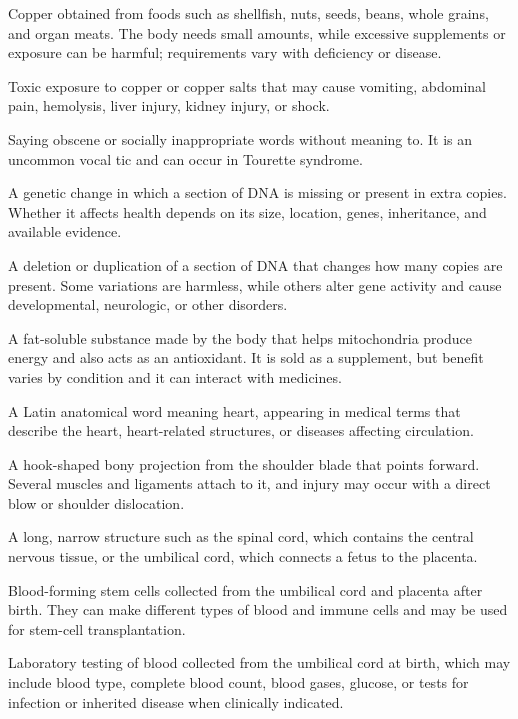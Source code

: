  Copper obtained from foods such as shellfish, nuts, seeds, beans, whole grains, and organ meats. The body needs small amounts, while excessive supplements or exposure can be harmful; requirements vary with deficiency or disease.

 Toxic exposure to copper or copper salts that may cause vomiting, abdominal pain, hemolysis, liver injury, kidney injury, or shock.

 Saying obscene or socially inappropriate words without meaning to. It is an uncommon vocal tic and can occur in Tourette syndrome.

 A genetic change in which a section of DNA is missing or present in extra copies. Whether it affects health depends on its size, location, genes, inheritance, and available evidence.

 A deletion or duplication of a section of DNA that changes how many copies are present. Some variations are harmless, while others alter gene activity and cause developmental, neurologic, or other disorders.

 A fat-soluble substance made by the body that helps mitochondria produce energy and also acts as an antioxidant. It is sold as a supplement, but benefit varies by condition and it can interact with medicines.

 A Latin anatomical word meaning heart, appearing in medical terms that describe the heart, heart-related structures, or diseases affecting circulation.

 A hook-shaped bony projection from the shoulder blade that points forward. Several muscles and ligaments attach to it, and injury may occur with a direct blow or shoulder dislocation.

 A long, narrow structure such as the spinal cord, which contains the central nervous tissue, or the umbilical cord, which connects a fetus to the placenta.

 Blood-forming stem cells collected from the umbilical cord and placenta after birth. They can make different types of blood and immune cells and may be used for stem-cell transplantation.

 Laboratory testing of blood collected from the umbilical cord at birth, which may include blood type, complete blood count, blood gases, glucose, or tests for infection or inherited disease when clinically indicated.

